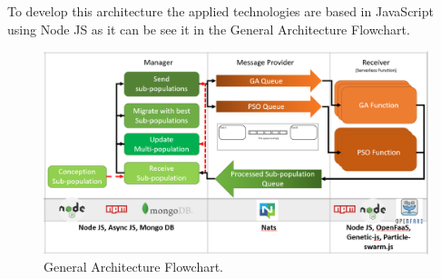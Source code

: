 \documentclass[runningheads]{llncs}
\begin{document}

To develop this architecture the applied technologies are based in JavaScript using Node JS as it can be
see it in the General Architecture Flowchart.

\begin{figure}[htp]
  \includegraphics[width=\textwidth]{general diagram architecture 2.png}
  \caption{General Architecture Flowchart.} \label{fig1}
  \end{figure}


\end{document}
